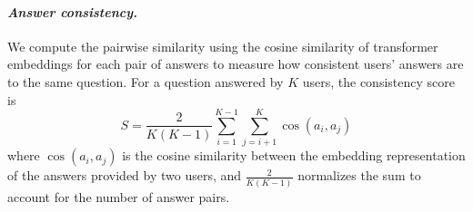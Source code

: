 

\paragraph{\textit{Answer consistency.}}
%
%
We compute the pairwise similarity using the cosine similarity of
transformer embeddings for each pair of answers to measure how consistent users' answers are to the same question.
For a question answered by \(K\) users, the consistency score is
\begin{equation}
S = \frac{2}{K(K-1)} \sum_{i=1}^{K-1} \sum_{j=i+1}^K \cos(a_i, a_j)
\end{equation}
%
where $\cos(a_i, a_j)$ is the cosine similarity between the embedding representation of the answers
%
%
provided by two users, and $\frac{2}{K(K-1)}$ normalizes the sum to account
for the number of answer pairs.

